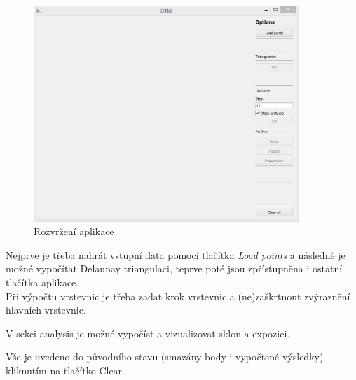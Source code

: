 \documentclass[a4paper, 12pt]{article}
\begin{document}
\begin{figure}[h]
	\centering
	\includegraphics[width=10cm]{aplikace.jpg}
	\caption{Rozvržení aplikace}
\end{figure}

Nejprve je třeba nahrát vstupní data pomocí tlačítka \textit{Load points} a následně je možné vypočítat Delaunay triangulaci, teprve poté jsou zpřístupněna i ostatní tlačítka aplikace. \\


Při výpočtu vrstevnic je třeba zadat krok vrstevnic a (ne)zaškrtnout zvýraznění hlavních vrstevnic.


V sekci analysis je možné vypočíst a vizualizovat sklon a expozici.


Vše je uvedeno do původního stavu (smazány body i vypočtené výsledky) kliknutím na tlačítko Clear.\\
\clearpage
\end{document}
